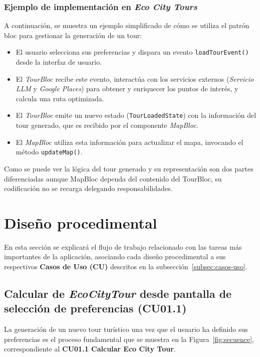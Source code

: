 \subsubsection{Ejemplo de implementación en \textit{Eco City Tours}}
A continuación, se muestra un ejemplo simplificado de cómo se utiliza el patrón \acrshort{bloc} para gestionar la generación de un tour:
\begin{itemize}
	\item El usuario selecciona sus preferencias y dispara un evento \texttt{loadTourEvent()} desde la interfaz de usuario.
	\item El \textit{TourBloc} recibe este evento, interactúa con los servicios externos (\textit{Servicio LLM} y \textit{Google Places}) para obtener y enriquecer los puntos de interés, y calcula una ruta optimizada.
	\item El \textit{TourBloc} emite un nuevo estado (\texttt{TourLoadedState}) con la información del tour generado, que es recibido por el componente \textit{MapBloc}.
	\item El \textit{MapBloc} utiliza esta información para actualizar el mapa, invocando el método \texttt{updateMap()}.
\end{itemize}
Como se puede ver la lógica del tour generado y su representación son dos partes diferenciadas aunque MapBloc dependa del contenido del TourBloc, su codificación no se recarga delegando responsabilidades.

\section{Diseño procedimental}
En esta sección se explicará el flujo de trabajo relacionado con las tareas más importantes de la aplicación, asociando cada diseño procedimental a sus respectivos \textbf{Casos de Uso (CU)} descritos en la subsección~\ref{subsec:casos-uso}.

\subsection{Calcular de \textit{EcoCityTour} desde pantalla de selección de preferencias (CU01.1)}
La generación de un nuevo tour turístico una vez que el usuario ha definido sus preferencias es el proceso fundamental que se muestra en la Figura~\ref{fig:secuence}, correspondiente al \textbf{CU01.1 Calcular Eco City Tour}.

